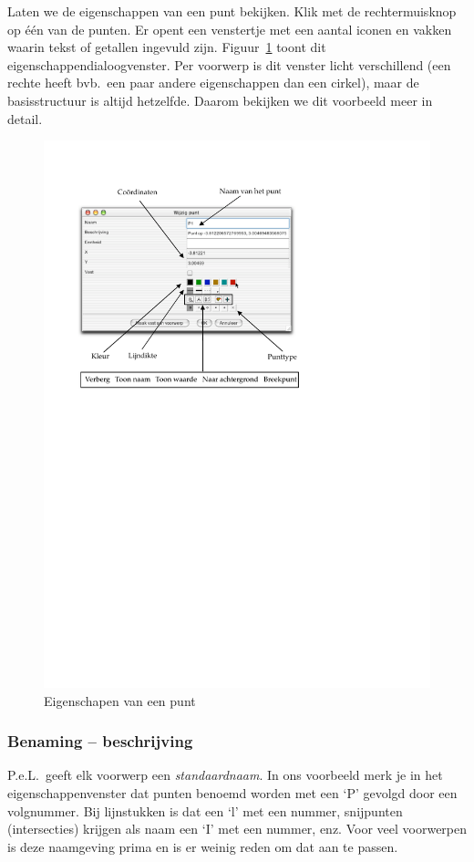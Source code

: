 Laten we de eigenschappen van een punt bekijken. Klik met de rechtermuisknop op \'{e}\'{e}n van de punten. Er opent een venstertje met een aantal iconen en vakken waarin tekst of getallen ingevuld zijn. Figuur~\ref{fig:punteig} toont dit eigenschappendialoogvenster. Per voorwerp is dit venster licht verschillend (een rechte heeft bvb.\ een paar andere eigenschappen dan een cirkel), maar de basisstructuur is altijd hetzelfde. Daarom bekijken we dit voorbeeld meer in detail.

\begin{figure}[htb]
    \centering
    \includegraphics[bb= 42 450 450 780,clip]{figuren/PeL/punteigenschappen.pdf}
       \caption{Eigenschapen van een punt}
    \label{fig:punteig}
\end{figure}

\subsubsection{Benaming -- beschrijving}
P.e.L.\ geeft elk voorwerp een \emph{standaardnaam}. In ons voorbeeld merk je  in het eigenschappenvenster dat punten benoemd worden met een `P' gevolgd door een volgnummer. Bij lijnstukken is dat een `l' met een nummer, snijpunten (intersecties) krijgen  als naam een `I' met een nummer, enz. Voor veel voorwerpen is deze naamgeving prima en is er weinig reden om dat aan te passen.

